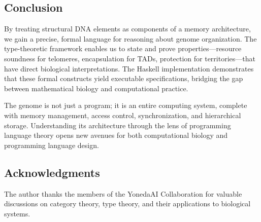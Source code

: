 \documentclass[12pt,a4paper]{article}
\theoremstyle{plain}
\theoremstyle{definition}
\begin{document}
\subsection{Conclusion}

By treating structural DNA elements as components of a memory architecture, we gain a precise, formal language for reasoning about genome organization. The type-theoretic framework enables us to state and prove properties---resource soundness for telomeres, encapsulation for TADs, protection for territories---that have direct biological interpretations. The Haskell implementation demonstrates that these formal constructs yield executable specifications, bridging the gap between mathematical biology and computational practice.

The genome is not just a program; it is an entire computing system, complete with memory management, access control, synchronization, and hierarchical storage. Understanding its architecture through the lens of programming language theory opens new avenues for both computational biology and programming language design.

\subsection*{Acknowledgments}

The author thanks the members of the YonedaAI Collaboration for valuable discussions on category theory, type theory, and their applications to biological systems.
\end{document}
